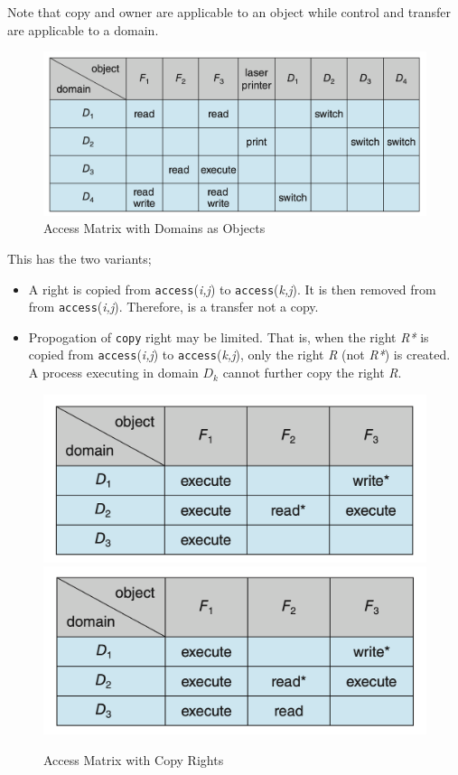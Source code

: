 \documentclass[oneside]{book}
\begin{document}
                Note that copy and owner are applicable to an object while control and transfer are applicable to a domain.\\
                \begin{figure}[H]
                    \centering
                    \includegraphics[width=0.6\linewidth]{figures/access_matrix_domobj.png}
                    \caption{Access Matrix with Domains as Objects}
                \end{figure}
                This has the two variants;
                \begin{itemize}
                    \item A right is copied from \texttt{access}(\textit{i,j}) to \texttt{access}(\textit{k,j}).
                    It is then removed from from \texttt{access}(\textit{i,j}). Therefore, is a transfer not a copy.
                    \item Propogation of \texttt{copy} right may be limited. That is, when the right \textit{R*} is
                    copied from \texttt{access}(\textit{i,j}) to \texttt{access}(\textit{k,j}), only the right 
                    \textit{R} (not \textit{R*}) is created. A process executing in domain $D_k$ cannot further copy the right \textit{R}.
                \end{itemize}
                \begin{figure}[H]
                    \centering
                    \includegraphics[width=0.4\linewidth]{figures/access_matrix_copy_1.png}%
                    \includegraphics[width=0.4\linewidth]{figures/access_matrix_copy_2.png}
                    \caption{Access Matrix with Copy Rights}
                \end{figure}
\end{document}
